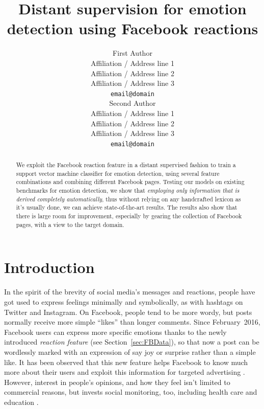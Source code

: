 \documentclass[11pt]{article}
\title{Distant supervision for emotion detection using Facebook reactions}
\author{First Author \\
  Affiliation / Address line 1 \\
  Affiliation / Address line 2 \\
  Affiliation / Address line 3 \\
  {\tt email@domain} \\\And
  Second Author \\
  Affiliation / Address line 1 \\
  Affiliation / Address line 2 \\
  Affiliation / Address line 3 \\
  {\tt email@domain} \\}
\date{}
\begin{document}
\maketitle
\begin{abstract}

We exploit the Facebook reaction feature in a distant supervised fashion to train a support vector machine classifier for emotion detection, using several feature combinations and combining different Facebook pages. Testing our models on existing benchmarks for emotion detection, we show that \textit{employing only information that is derived completely automatically}, thus without relying on any handcrafted lexicon as it's usually done, we can achieve state-of-the-art results. The results also show that there is large room for improvement, especially by gearing the collection of Facebook pages, with a view to the target domain. 

\end{abstract}





\section{Introduction}

In the spirit of the brevity of social media's messages and reactions, people have got used to express feelings minimally and symbolically, as with hashtags on Twitter and Instagram. On Facebook, people tend to be more wordy, but posts normally receive more simple ``likes'' than longer comments. Since February~2016, Facebook users can express more specific emotions thanks to the newly introduced \textit{reaction feature} (see Section~\ref{sec:FBData}), so that now a post can be wordlessly marked with an expression of say joy or surprise rather than a simple like. It has been observed that this new feature helps Facebook to know much more about their users and exploit this information for targeted advertising \cite{wired}.  However, interest in people's opinions, and how they feel isn't limited to commercial reasons, but invests social monitoring, too, including health care and education \cite{SentimentEmotionSurvey2015}. 




\end{document}
